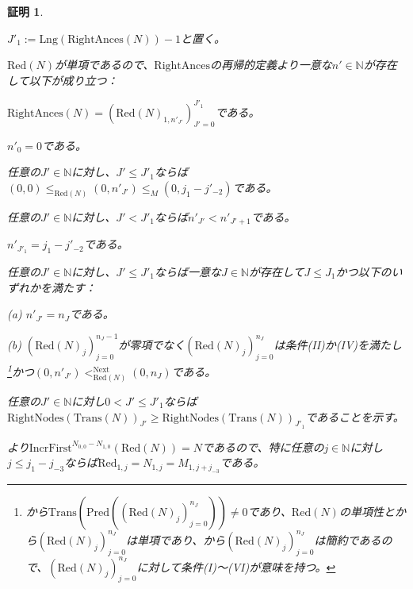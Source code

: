 \documentclass[dvipdfmx,uplatex]{jsarticle}
\theoremstyle{customnonumberbreakfortheorem}
\theoremstyle{customnonumberbreakforproof}
\newtheorem{hideableproof}{証明}
\begin{document}
\begin{hideableproof}
\begin{indented}
		\item \(J'_1 := \textrm{Lng}(\textrm{RightAnces}(N))-1\)と置く。
		\item \(\textrm{Red}(N)\)が単項であるので、\(\textrm{RightAnces}\)の再帰的定義より一意な\(n' \in \mathbb{N}\)が存在して以下が成り立つ：
		\begin{indented}
			\item \(\textrm{RightAnces}(N) = (\textrm{Red}(N)_{1,n'_{J'}})_{J'=0}^{J'_1}\)である。
			\item \(n'_0 = 0\)である。
			\item 任意の\(J' \in \mathbb{N}\)に対し、\(J' \leq J'_1\)ならば\((0,0) \leq_{\textrm{Red}(N)} (0,n'_{J'}) \leq_M (0,j_1-j'_{-2})\)である。
			\item 任意の\(J' \in \mathbb{N}\)に対し、\(J' < J'_1\)ならば\(n'_{J'} < n'_{J'+1}\)である。
			\item \(n'_{J'_1} = j_1-j'_{-2}\)である。
			\item 任意の\(J' \in \mathbb{N}\)に対し、\(J' \leq J'_1\)ならば一意な\(J \in \mathbb{N}\)が存在して\(J \leq J_1\)かつ以下のいずれかを満たす：
			\begin{indented}
				\item[(a)] \(n'_{J'} = n_J\)である。
				\item[(b)] \((\textrm{Red}(N)_j)_{j=0}^{n_J-1}\)が零項でなく\((\textrm{Red}(N)_j)_{j=0}^{n_J}\)は条件(II)か(IV)を満たし\footnote{から\(\textrm{Trans}(\textrm{Pred}((\textrm{Red}(N)_j)_{j=0}^{n_J})) \neq 0\)であり、\(\textrm{Red}(N)\)の単項性とから\((\textrm{Red}(N)_j)_{j=0}^{n_J}\)は単項であり、から\((\textrm{Red}(N)_j)_{j=0}^{n_J}\)は簡約であるので、\((\textrm{Red}(N)_j)_{j=0}^{n_J}\)に対して条件(I)～(VI)が意味を持つ。}かつ\((0,n'_{J'}) <_{\textrm{Red}(N)}^{\textrm{Next}} (0,n_J)\)である。
			\end{indented}
		\end{indented}
		\item
		\item 任意の\(J' \in \mathbb{N}\)に対し\(0 < J' \leq J'_1\)ならば\(\textrm{RightNodes}(\textrm{Trans}(N))_{J'} \geq \textrm{RightNodes}(\textrm{Trans}(N))_{J'_1}\)であることを示す。
		\begin{indented}
			\item {}より\(\textrm{IncrFirst}^{N_{0,0}-N_{1,0}}(\textrm{Red}(N)) = N\)であるので、特に任意の\(j \in \mathbb{N}\)に対し\(j \leq j_1-j_{-3}\)ならば\(\textrm{Red}_{1,j} = N_{1,j} = M_{1,j+j_{-3}}\)である。

\end{indented}
\end{indented}
\end{hideableproof}
\end{document}

